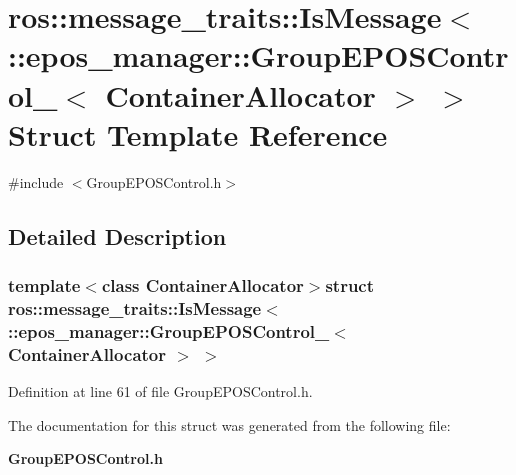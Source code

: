 \section{ros\-:\-:message\-\_\-traits\-:\-:\-Is\-Message$<$ \-:\-:epos\-\_\-manager\-:\-:\-Group\-E\-P\-O\-S\-Control\-\_\-$<$ \-Container\-Allocator $>$ $>$ \-Struct \-Template \-Reference}
\label{structros_1_1message__traits_1_1IsMessage_3_01_1_1epos__manager_1_1GroupEPOSControl___3_01ContainerAllocator_01_4_01_4}


{\ttfamily \#include $<$\-Group\-E\-P\-O\-S\-Control.\-h$>$}



\subsection{\-Detailed \-Description}
\subsubsection*{template$<$class Container\-Allocator$>$struct ros\-::message\-\_\-traits\-::\-Is\-Message$<$ \-::epos\-\_\-manager\-::\-Group\-E\-P\-O\-S\-Control\-\_\-$<$ Container\-Allocator $>$ $>$}



\-Definition at line 61 of file \-Group\-E\-P\-O\-S\-Control.\-h.



\-The documentation for this struct was generated from the following file\-:\begin{DoxyCompactItemize}
\item 
{\bf \-Group\-E\-P\-O\-S\-Control.\-h}\end{DoxyCompactItemize}
